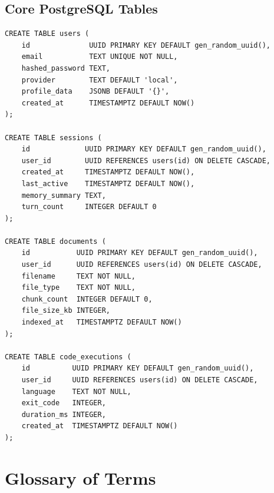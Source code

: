 \subsection{Core PostgreSQL Tables}
\label{subsec:pg-schema}

\begin{verbatim}
CREATE TABLE users (
    id              UUID PRIMARY KEY DEFAULT gen_random_uuid(),
    email           TEXT UNIQUE NOT NULL,
    hashed_password TEXT,
    provider        TEXT DEFAULT 'local',
    profile_data    JSONB DEFAULT '{}',
    created_at      TIMESTAMPTZ DEFAULT NOW()
);

CREATE TABLE sessions (
    id             UUID PRIMARY KEY DEFAULT gen_random_uuid(),
    user_id        UUID REFERENCES users(id) ON DELETE CASCADE,
    created_at     TIMESTAMPTZ DEFAULT NOW(),
    last_active    TIMESTAMPTZ DEFAULT NOW(),
    memory_summary TEXT,
    turn_count     INTEGER DEFAULT 0
);

CREATE TABLE documents (
    id           UUID PRIMARY KEY DEFAULT gen_random_uuid(),
    user_id      UUID REFERENCES users(id) ON DELETE CASCADE,
    filename     TEXT NOT NULL,
    file_type    TEXT NOT NULL,
    chunk_count  INTEGER DEFAULT 0,
    file_size_kb INTEGER,
    indexed_at   TIMESTAMPTZ DEFAULT NOW()
);

CREATE TABLE code_executions (
    id          UUID PRIMARY KEY DEFAULT gen_random_uuid(),
    user_id     UUID REFERENCES users(id) ON DELETE CASCADE,
    language    TEXT NOT NULL,
    exit_code   INTEGER,
    duration_ms INTEGER,
    created_at  TIMESTAMPTZ DEFAULT NOW()
);
\end{verbatim}

\section{Glossary of Terms}
\label{sec:glossary}

